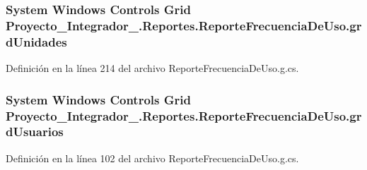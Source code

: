 \hypertarget{class_proyecto___integrador__3_1_1_reportes_1_1_reporte_frecuencia_de_uso_a0054ea7e45426e7bc4779c6d4e3144b8}{
\subsubsection[{grd\-Unidades}]{\setlength{\rightskip}{0pt plus 5cm}System Windows Controls Grid Proyecto\-\_\-\-Integrador\-\_.\-Reportes.\-Reporte\-Frecuencia\-De\-Uso.\-grd\-Unidades\hspace{0.3cm}{\ttfamily [package]}}}\label{class_proyecto___integrador__3_1_1_reportes_1_1_reporte_frecuencia_de_uso_a0054ea7e45426e7bc4779c6d4e3144b8}


Definición en la línea 214 del archivo Reporte\-Frecuencia\-De\-Uso.\-g.\-cs.

\hypertarget{class_proyecto___integrador__3_1_1_reportes_1_1_reporte_frecuencia_de_uso_a559e1b9ac74bc2111e3d7c07400db096}{
\subsubsection[{grd\-Usuarios}]{\setlength{\rightskip}{0pt plus 5cm}System Windows Controls Grid Proyecto\-\_\-\-Integrador\-\_.\-Reportes.\-Reporte\-Frecuencia\-De\-Uso.\-grd\-Usuarios\hspace{0.3cm}{\ttfamily [package]}}}\label{class_proyecto___integrador__3_1_1_reportes_1_1_reporte_frecuencia_de_uso_a559e1b9ac74bc2111e3d7c07400db096}


Definición en la línea 102 del archivo Reporte\-Frecuencia\-De\-Uso.\-g.\-cs.


